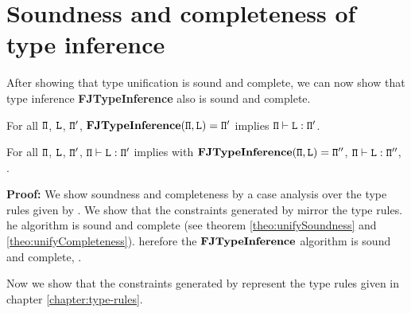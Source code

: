 \section{Soundness and completeness of type inference}
\label{sec:soundn-compl-type}

After showing that type unification is sound and complete, we
can now show that type inference \textbf{FJTypeInference} also is
sound and complete.
\begin{theorem}[Soundness] For all ${\tt \Pi}$, ${\tt L}$, ${\tt \Pi'}$, 
  $\textbf{FJTypeInference}({\tt \Pi},\texttt{L}) = {\tt \Pi}'$ implies ${\tt \Pi} \vdash \texttt{L} : {\tt \Pi}'$.
\end{theorem}
\begin{theorem}[Completeness]  For all ${\tt \Pi}$, ${\tt L}$, ${\tt \Pi'}$,
  ${\tt \Pi} \vdash \texttt{L} : {\tt \Pi}'$ implies  with $\textbf{FJTypeInference}({\tt \Pi},\texttt{L}) = {\tt \Pi}''$,
  ${\tt \Pi} \vdash \texttt{L} : {\tt \Pi}''$, .
\end{theorem}
\textbf{Proof:}
We show soundness and completeness by a case analysis over the type rules given by \TFGJ{}.
We  show that the constraints generated by \fjtype{} mirror
the \TFGJ{} type rules.
he \unify{} algorithm is sound and complete (see theorem \ref{theo:unifySoundness} and \ref{theo:unifyCompleteness}).
herefore the $\textbf{FJTypeInference}$ algorithm is sound and
complete, .


Now we show that the constraints generated by {\fjtype{}}
represent the type rules given in chapter \ref{chapter:type-rules}.


